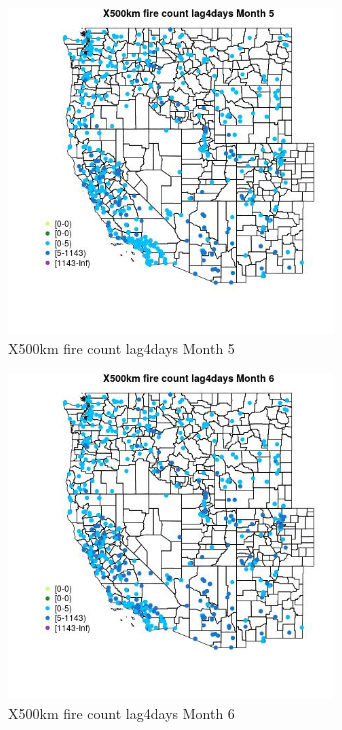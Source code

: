 \begin{figure} 
\centering  
\includegraphics[width=0.77\textwidth]{Code_Outputs/Report_ML_input_PM25_Step4_part_e_de_duplicated_aves_compiled_2019-05-14wNAs_MapObsMo5X500km_fire_count_lag4days.jpg} 
\caption{\label{fig:Report_ML_input_PM25_Step4_part_e_de_duplicated_aves_compiled_2019-05-14wNAsMapObsMo5X500km_fire_count_lag4days}X500km fire count lag4days Month 5} 
\end{figure} 
 

\begin{figure} 
\centering  
\includegraphics[width=0.77\textwidth]{Code_Outputs/Report_ML_input_PM25_Step4_part_e_de_duplicated_aves_compiled_2019-05-14wNAs_MapObsMo6X500km_fire_count_lag4days.jpg} 
\caption{\label{fig:Report_ML_input_PM25_Step4_part_e_de_duplicated_aves_compiled_2019-05-14wNAsMapObsMo6X500km_fire_count_lag4days}X500km fire count lag4days Month 6} 
\end{figure} 
 

